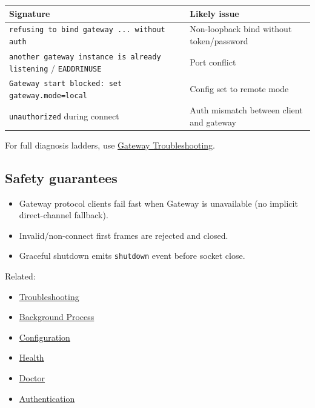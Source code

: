 \begin{table}[h]
\centering
\small
\begin{tabular}{|l|l|}
\hline
Signature & Likely issue \\
\hline
\texttt{refusing to bind gateway ... without auth} & Non-loopback bind without token/password \\
\hline
\texttt{another gateway instance is already listening} / \texttt{EADDRINUSE} & Port conflict \\
\hline
\texttt{Gateway start blocked: set gateway.mode=local} & Config set to remote mode \\
\hline
\texttt{unauthorized} during connect & Auth mismatch between client and gateway \\
\hline
\end{tabular}
\end{table}



For full diagnosis ladders, use \href{/gateway/troubleshooting}{Gateway Troubleshooting}.

\subsection{Safety guarantees}


\begin{itemize}
  \item Gateway protocol clients fail fast when Gateway is unavailable (no implicit direct-channel fallback).
  \item Invalid/non-connect first frames are rejected and closed.
  \item Graceful shutdown emits \texttt{shutdown} event before socket close.
\end{itemize}


\hrulefill


Related:

\begin{itemize}
  \item \href{/gateway/troubleshooting}{Troubleshooting}
  \item \href{/gateway/background-process}{Background Process}
  \item \href{/gateway/configuration}{Configuration}
  \item \href{/gateway/health}{Health}
  \item \href{/gateway/doctor}{Doctor}
  \item \href{/gateway/authentication}{Authentication}
\end{itemize}



